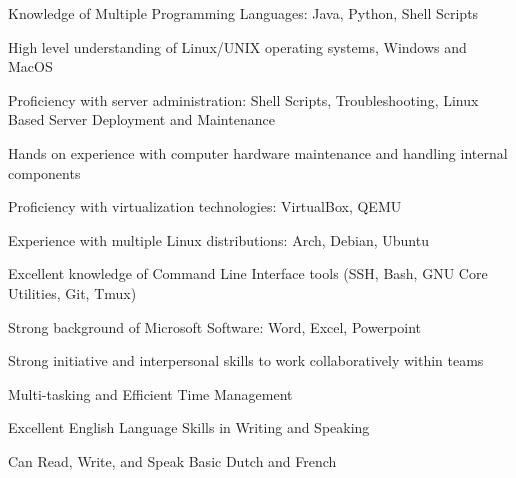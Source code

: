



\begin{cvparagraph}



\begin{cventries}
  \cventry
{} %
{} %
{} %
{} %
{ %
\begin{cvitems*}
	\item{Knowledge of Multiple Programming Languages: Java, Python, Shell Scripts}
	\item{High level understanding of Linux/UNIX operating systems, Windows and MacOS}
	\item{Proficiency with server administration: Shell Scripts, Troubleshooting, Linux Based Server Deployment and Maintenance}
	\item{Hands on experience with computer hardware maintenance and handling internal components}
	\item{Proficiency with virtualization technologies: VirtualBox, QEMU}
	\item{Experience with multiple Linux distributions: Arch, Debian, Ubuntu}
	\item{Excellent knowledge of Command Line Interface tools (SSH, Bash, GNU Core Utilities, Git, Tmux)}
	\item{Strong background of Microsoft Software: Word, Excel, Powerpoint}
	\item{Strong initiative and interpersonal skills to work collaboratively within teams}
	\item{Multi-tasking and Efficient Time Management}
	\item{Excellent English Language Skills in Writing and Speaking}
	\item{Can Read, Write, and Speak Basic Dutch and French}
\end{cvitems*}
}
\end{cventries}



\end{cvparagraph}
